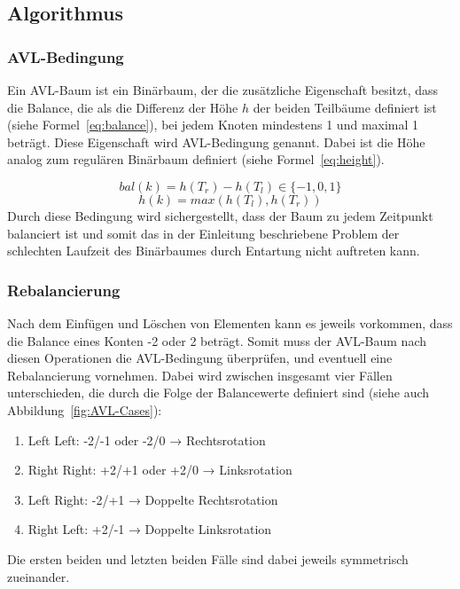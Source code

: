 \subsection{Algorithmus}\label{subsec:algorithmus}

\subsubsection{AVL-Bedingung}
Ein AVL-Baum ist ein Binärbaum, der die zusätzliche Eigenschaft besitzt, dass
die Balance, die als die Differenz der Höhe $h$ der beiden
Teilbäume definiert ist (siehe Formel~\ref{eq:balance}), bei jedem Knoten mindestens 1 und
maximal 1 beträgt.
Diese Eigenschaft wird AVL-Bedingung genannt.
Dabei ist die Höhe analog zum regulären Binärbaum definiert (siehe Formel~\ref{eq:height}).

\begin{equation}
    bal(k) = h(T_r) - h(T_l)\label{eq:balance} \in \{-1,0,1\}
\end{equation}
\begin{equation}
    h(k) = max(h(T_l), h(T_r))\label{eq:height}
\end{equation}
Durch diese Bedingung wird sichergestellt, dass der Baum zu jedem Zeitpunkt
balanciert ist und somit das in der Einleitung beschriebene Problem der
schlechten Laufzeit des Binärbaumes durch Entartung nicht auftreten kann.

\subsubsection{Rebalancierung}\label{par:rebalancing}
Nach dem Einfügen und Löschen von Elementen kann es jeweils vorkommen, dass die
Balance eines Konten -2 oder 2 beträgt.
Somit muss der AVL-Baum nach diesen Operationen die AVL-Bedingung überprüfen,
und eventuell eine Rebalancierung vornehmen.
Dabei wird zwischen insgesamt vier Fällen unterschieden, die durch die Folge
der Balancewerte definiert sind (siehe auch Abbildung~\ref{fig:AVL-Cases}):
\begin{enumerate}
    \item Left Left: -2/-1 oder -2/0 → Rechtsrotation\label{enm:rebal1}
    \item Right Right: +2/+1 oder +2/0 → Linksrotation \label{enm:rebal2}
    \item Left Right: -2/+1 → Doppelte Rechtsrotation \label{enm:rebal3}
    \item Right Left: +2/-1 → Doppelte Linksrotation \label{enm:rebal4}
\end{enumerate}
Die ersten beiden und letzten beiden Fälle sind dabei jeweils symmetrisch zueinander.

